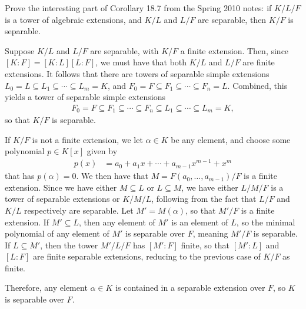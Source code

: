 \documentclass[10pt]{mypackage}
\begin{document}
\RaggedRight
\begin{problem}[Problem 1]
  Prove the interesting part of Corollary 18.7 from the Spring 2010 notes: if $K/L/F$ is a tower of algebraic extensions, and $K/L$ and $L/F$ are separable, then $K/F$ is separable.
\end{problem}
\begin{solution}
  Suppose $K/L$ and $L/F$ are separable, with $K/F$ a finite extension. Then, since $\left[ K:F \right] = \left[ K:L \right]\left[ L:F \right]$, we must have that both $K/L$ and $L/F$ are finite extensions. It follows that there are towers of separable simple extensions $L_0 =L \subseteq L_1\subseteq\cdots\subseteq L_m = K$, and $F_0 = F \subseteq F_1\subseteq\cdots\subseteq F_n = L$. Combined, this yields a tower of separable simple extensions 
  \begin{align*}
    F_0 = F \subseteq F_1\subseteq \cdots \subseteq F_n\subseteq L_1\subseteq\cdots\subseteq L_m = K,
  \end{align*}
  so that $K/F$ is separable.

  If $K/F$ is not a finite extension, we let $\alpha\in K$ be any element, and choose some polynomial $p\in K[x]$ given by
  \begin{align*}
    p(x) &= a_0 + a_1 x + \cdots + a_{m-1}x^{m-1} + x^{m}
  \end{align*}
  that has $p(\alpha) = 0$. We then have that $M = F\left( a_0,\dots,a_{m-1} \right)/F$ is a finite extension. Since we have either $M\subseteq L$ or $L\subseteq M$, we have either $L/M/F$ is a tower of separable extensions or $K/M/L$, following from the fact that $L/F$ and $K/L$ respectively are separable. Let $M' = M\left( \alpha \right)$, so that $M'/F$ is a finite extension. If $M'\subseteq L$, then any element of $M'$ is an element of $L$, so the minimal polynomial of any element of $M'$ is separable over $F$, meaning $M'/F$ is separable. If $L\subseteq M'$, then the tower $M'/L/F$ has $\left[ M':F \right]$ finite, so that $\left[ M':L \right]$ and $\left[ L:F \right]$ are finite separable extensions, reducing to the previous case of $K/F$ as finite.

  Therefore, any element $\alpha\in K$ is contained in a separable extension over $F$, so $K$ is separable over $F$.
\end{solution}
\end{document}
